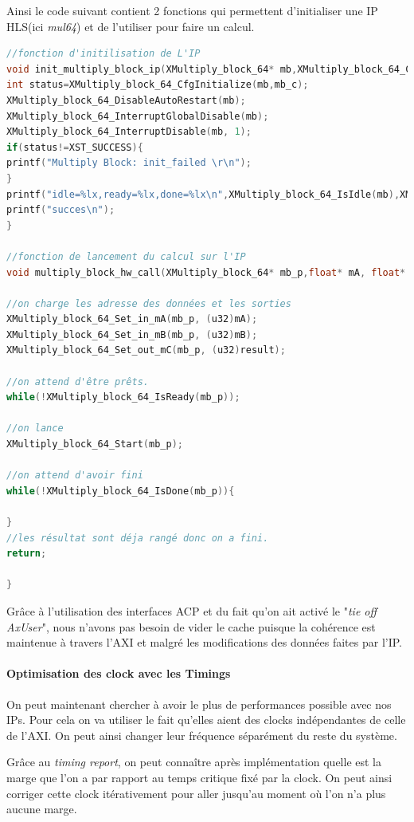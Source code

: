 \documentclass[12pt,a4paper]{article}
\begin{document}
Ainsi le code suivant contient 2 fonctions qui permettent d'initialiser une IP HLS(ici \textit{mul64}) et de l'utiliser pour faire un calcul.
\begin{lstlisting}[language=C]
//fonction d'initilisation de L'IP
void init_multiply_block_ip(XMultiply_block_64* mb,XMultiply_block_64_Config* mb_c){
int status=XMultiply_block_64_CfgInitialize(mb,mb_c);
XMultiply_block_64_DisableAutoRestart(mb);
XMultiply_block_64_InterruptGlobalDisable(mb);
XMultiply_block_64_InterruptDisable(mb, 1);
if(status!=XST_SUCCESS){
printf("Multiply Block: init_failed \r\n");
}
printf("idle=%lx,ready=%lx,done=%lx\n",XMultiply_block_64_IsIdle(mb),XMultiply_block_64_IsReady(mb),XMultiply_block_64_IsDone(mb));
printf("succes\n");
}

//fonction de lancement du calcul sur l'IP
void multiply_block_hw_call(XMultiply_block_64* mb_p,float* mA, float* mB, float* result){

//on charge les adresse des données et les sorties
XMultiply_block_64_Set_in_mA(mb_p, (u32)mA);
XMultiply_block_64_Set_in_mB(mb_p, (u32)mB);
XMultiply_block_64_Set_out_mC(mb_p, (u32)result);

//on attend d'être prêts.
while(!XMultiply_block_64_IsReady(mb_p));

//on lance
XMultiply_block_64_Start(mb_p);

//on attend d'avoir fini	
while(!XMultiply_block_64_IsDone(mb_p)){

}
//les résultat sont déja rangé donc on a fini.
return;

}

\end{lstlisting}
Grâce à l'utilisation des interfaces ACP et du fait qu'on ait activé le "\textit{tie off AxUser}", nous n'avons pas besoin de vider le cache puisque la cohérence est maintenue à travers l'AXI et malgré les modifications des données faites par l'IP.

\label{SmartClock}
\paragraph{Optimisation des clock avec les Timings}
On peut maintenant chercher à avoir le plus de performances possible avec nos IPs. Pour cela on va utiliser le fait qu'elles aient des clocks indépendantes de celle de l'AXI. On peut ainsi changer leur fréquence séparément du reste du système.

Grâce au \textit{timing report}, on peut connaître après implémentation quelle est la marge que l'on a par rapport au temps critique fixé par la clock. On peut ainsi corriger cette clock itérativement pour aller jusqu'au moment où l'on n'a plus aucune marge.
\end{document}
